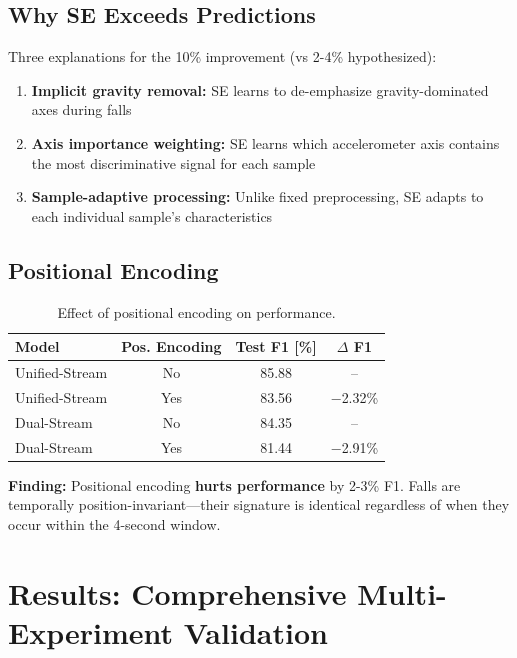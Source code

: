 \documentclass{article}
\begin{document}
\subsection{Why SE Exceeds Predictions}

Three explanations for the 10\% improvement (vs 2-4\% hypothesized):

\begin{enumerate}
    \item \textbf{Implicit gravity removal:} SE learns to de-emphasize gravity-dominated axes during falls
    \item \textbf{Axis importance weighting:} SE learns which accelerometer axis contains the most discriminative signal for each sample
    \item \textbf{Sample-adaptive processing:} Unlike fixed preprocessing, SE adapts to each individual sample's characteristics
\end{enumerate}

\subsection{Positional Encoding}

\begin{table}[htbp]
    \centering
    \caption{Effect of positional encoding on performance.}
    \label{tab:pos_enc}
    \begin{tabular}{lccc}
        \toprule
        \textbf{Model} & \textbf{Pos. Encoding} & \textbf{Test F1 [\%]} & \textbf{$\Delta$ F1} \\
        \midrule
        Unified-Stream & No & 85.88 & -- \\
        Unified-Stream & Yes & 83.56 & $-$2.32\% \\
        Dual-Stream & No & 84.35 & -- \\
        Dual-Stream & Yes & 81.44 & $-$2.91\% \\
        \bottomrule
    \end{tabular}
\end{table}

\textbf{Finding:} Positional encoding \textbf{hurts performance} by 2-3\% F1. Falls are temporally position-invariant---their signature is identical regardless of when they occur within the 4-second window.

\section{Results: Comprehensive Multi-Experiment Validation}
\end{document}
